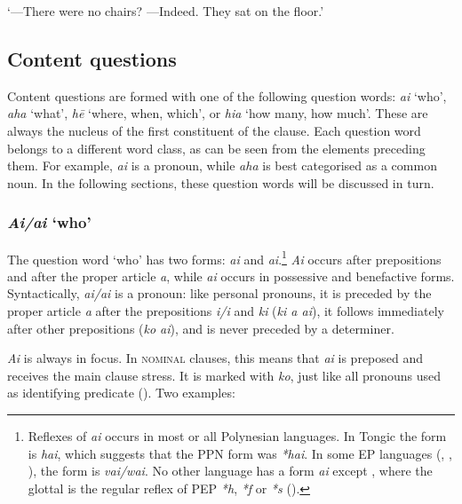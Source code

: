 \glt 
‘—There were no chairs? —Indeed. They sat on the floor.’ \textstyleExampleref{[R413.635]} 
\z

\subsection{Content questions}\label{sec:10.3.2}
Content questions are formed with one of the following question words: \textit{ai} ‘who’, \textit{aha} ‘what’, \textit{hē} ‘where, when, which’, or \textit{hia} ‘how many, how much’. These are always the nucleus of the first constituent of the clause.
Each question word belongs to a different word class, as can be seen from the elements preceding them. For example, \textit{ai} is a pronoun, while \textit{aha} is best categorised as a common noun. In the following sections, these question words will be discussed in turn.

\subsubsection{\textit{Ai/{\ꞌ}ai} ‘who’}\label{sec:10.3.2.1}
The question word ‘who’ has two forms: \textit{ai} and \textit{{\ꞌ}ai}.\footnote{\label{fn:486}Reflexes of \textit{ai} occurs in most or all Polynesian languages. In Tongic the form is \textit{hai}, which suggests that the PPN form was \textit{*hai}. In some EP languages (, , ), the form is \textit{vai/wai}. No other language has a form \textit{{\ꞌ}ai} except , where the glottal is the regular reflex of PEP \textit{*h}, \textit{*f} or \textit{*s} ().} \textit{Ai} occurs after prepositions and after the proper article \textit{a}, while \textit{{\ꞌ}ai} occurs in possessive and benefactive forms. Syntactically, \textit{ai/{\ꞌ}ai} is a pronoun: like personal pronouns, it is preceded by the proper article \textit{a} after the prepositions \textit{{\ꞌ}i/i} and \textit{ki} (\textit{ki a ai}), it follows immediately after other prepositions (\textit{ko ai}), and is never preceded by a determiner. 

\textit{Ai} is always in focus. In \textsc{nominal} clauses, this means that \textit{ai} is preposed and receives the main clause stress. It is marked with \textit{ko}, just like all pronouns used as identifying predicate (). Two examples:

